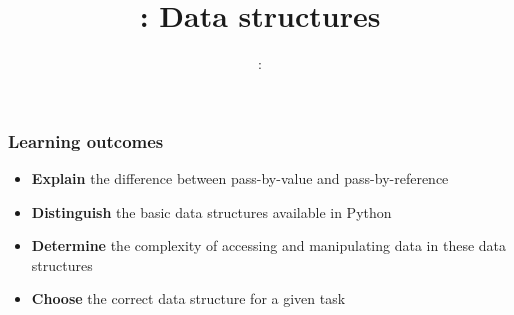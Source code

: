 \usepackage{../../beamerthemeFalmouthGamesAcademy}
\usepackage{multimedia}
\graphicspath{ {../../} }

\lstset{language=Python
}

\usepackage[normalem]{ulem}
\usepackage{wasysym}

\usepackage{pdfpages}

\usetikzlibrary{arrows,automata}
\usetikzlibrary{tikzmark,calc}




\title{\sessionnumber: Data structures}
\subtitle{\modulecode: \moduletitle}

\frame{\titlepage} 

\begin{frame}
	\frametitle{Learning outcomes}
	\begin{itemize}
		\item \textbf{Explain} the difference between pass-by-value and pass-by-reference
		\item \textbf{Distinguish} the basic data structures available in Python
		\item \textbf{Determine} the complexity of accessing and manipulating data in these data structures
		\item \textbf{Choose} the correct data structure for a given task
	\end{itemize}
\end{frame}






